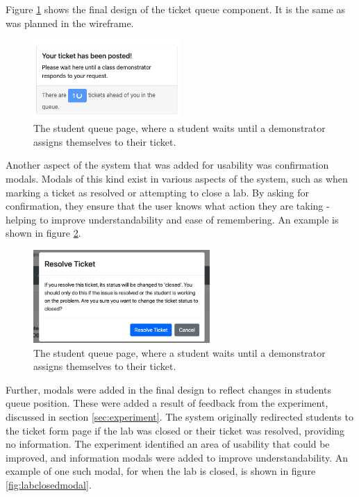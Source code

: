Figure \ref{fig:queue} shows the final design of the ticket queue component. It is the same as was planned in the wireframe.

\begin{figure}[H]
    \centering
    \includegraphics[width=0.5\textwidth]{7design/images/queue.png}
    \caption{The student queue page, where a student waits until a demonstrator assigns themselves to their ticket.}
    \label{fig:queue}
\end{figure}

Another aspect of the system that was added for usability was confirmation modals. Modals of this kind exist in various aspects of the system, such as when marking a ticket as resolved or attempting to close a lab. By asking for confirmation, they ensure that the user knows what action they are taking - helping to improve understandability and ease of remembering. An example is shown in figure \ref{fig:confmodal}.

\begin{figure}[H]
    \centering
    \includegraphics[width=0.6\textwidth]{7design/images/closeTicketModal.png}
    \caption{The student queue page, where a student waits until a demonstrator assigns themselves to their ticket.}
    \label{fig:confmodal}
\end{figure}

Further, modals were added in the final design to reflect changes in students queue position. These were added a result of feedback from the experiment, discussed in section \ref{sec:experiment}. The system originally redirected students to the ticket form page if the lab was closed or their ticket was resolved, providing no information. The experiment identified an area of usability that could be improved, and information modals were added to improve understandability. An example of one such modal, for when the lab is closed, is shown in figure \ref{fig:labclosedmodal}.

